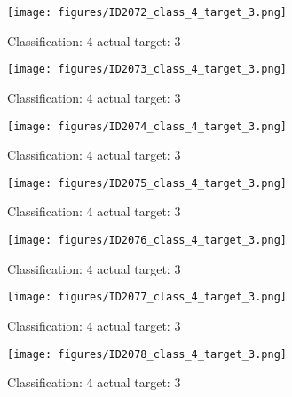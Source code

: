 \begin{figure}[h!]
\begin{center}
\texttt{[image: figures/ID2072\_class\_4\_target\_3.png]}
\end{center}
\caption{ Classification: 4 actual target: 3}
\label{fig:ID2072_class_4_target_3}
\end{figure}
\begin{figure}[h!]
\begin{center}
\texttt{[image: figures/ID2073\_class\_4\_target\_3.png]}
\end{center}
\caption{ Classification: 4 actual target: 3}
\label{fig:ID2073_class_4_target_3}
\end{figure}
\begin{figure}[h!]
\begin{center}
\texttt{[image: figures/ID2074\_class\_4\_target\_3.png]}
\end{center}
\caption{ Classification: 4 actual target: 3}
\label{fig:ID2074_class_4_target_3}
\end{figure}
\begin{figure}[h!]
\begin{center}
\texttt{[image: figures/ID2075\_class\_4\_target\_3.png]}
\end{center}
\caption{ Classification: 4 actual target: 3}
\label{fig:ID2075_class_4_target_3}
\end{figure}
\begin{figure}[h!]
\begin{center}
\texttt{[image: figures/ID2076\_class\_4\_target\_3.png]}
\end{center}
\caption{ Classification: 4 actual target: 3}
\label{fig:ID2076_class_4_target_3}
\end{figure}
\begin{figure}[h!]
\begin{center}
\texttt{[image: figures/ID2077\_class\_4\_target\_3.png]}
\end{center}
\caption{ Classification: 4 actual target: 3}
\label{fig:ID2077_class_4_target_3}
\end{figure}
\begin{figure}[h!]
\begin{center}
\texttt{[image: figures/ID2078\_class\_4\_target\_3.png]}
\end{center}
\caption{ Classification: 4 actual target: 3}
\label{fig:ID2078_class_4_target_3}
\end{figure}
